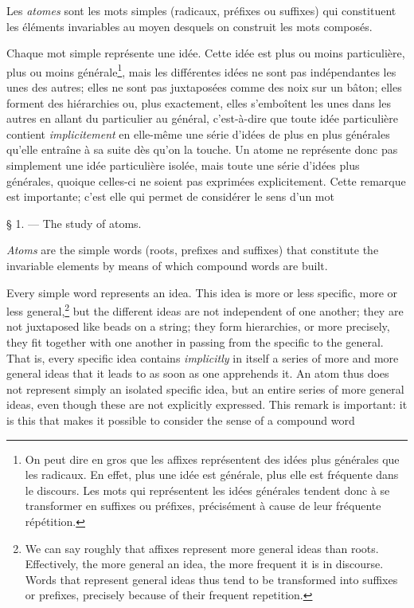 \begin{sloppypar}
{  Les \emph{atomes} sont les mots simples (radicaux, préfixes ou
  suffixes) qui constituent les éléments invariables au moyen desquels
  on construit les mots composés.

  Chaque mot simple représente une idée. Cette idée est plus ou moins
  particulière, plus ou moins générale\footnote{On peut dire en gros
    que les affixes représentent des idées plus générales que les
    radicaux. En effet, plus une idée est générale, plus elle est
    fréquente dans le discours. Les mots qui représentent les idées
    générales tendent donc à se transformer en suffixes ou préfixes,
    précisément à cause de leur fréquente répétition.}, mais les
  différentes idées ne sont pas indépendantes les unes des autres;
  elles ne sont pas juxtaposées comme des noix sur un bâton; elles
  forment des hiérarchies ou, plus exactement, elles s’emboîtent les
  unes dans les autres en allant du particulier au général,
  c’est-à-dire que toute idée particulière contient
  \emph{implicitement} en elle-même une série d’idées de plus en plus
  générales qu’elle entraîne à sa suite dès qu’on la touche. Un atome
  ne représente donc pas simplement une idée particulière isolée, mais
  toute une série d’idées plus générales, quoique celles-ci ne soient
  pas exprimées explicitement. Cette remarque est importante; c’est
  elle qui permet de considérer le sens d’un mot} %
{\begin{center}§ 1. — The study of atoms.\end{center}

  \emph{Atoms} are the simple words (roots, prefixes and suffixes)
  that constitute the invariable elements by means of which compound
  words are built.

  Every simple word represents an idea. This idea is more or less
  specific, more or less general,\footnote{We can say roughly that
    affixes represent more general ideas than roots. Effectively, the
    more general an idea, the more frequent it is in discourse. Words
    that represent general ideas thus tend to be transformed into
    suffixes or prefixes, precisely because of their frequent
    repetition.} but the different ideas are not independent of one
  another; they are not juxtaposed like beads on a string; they form
  hierarchies, or more precisely, they fit together with one another
  in passing from the specific to the general.  That is, every
  specific idea contains \emph{implicitly} in itself a series of more
  and more general ideas that it leads to as soon as one apprehends
  it. An atom thus does not represent simply an isolated specific
  idea, but an entire series of more general ideas, even though these
  are not explicitly expressed. This remark is important: it is this
  that makes it possible to consider the sense of a compound word }


\end{sloppypar}
